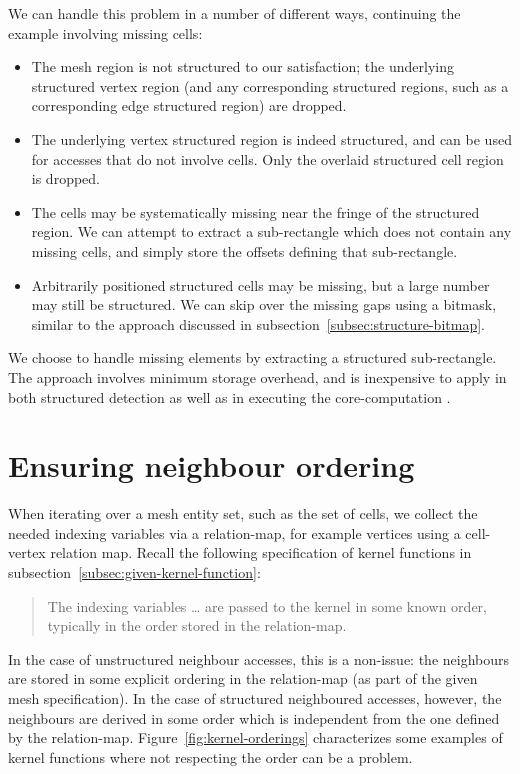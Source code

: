We can handle this problem in a number of different ways, continuing the example involving missing cells:
\begin{itemize}
\item The mesh region is not structured to our satisfaction; the underlying structured vertex region (and any corresponding structured regions, such as a corresponding edge structured region) are dropped.
\item The underlying vertex structured region is indeed structured, and can be used for accesses that do not involve cells. Only the overlaid structured cell region is dropped.
\item The cells may be systematically missing near the fringe of the structured region. We can attempt to extract a sub-rectangle which does not contain any missing cells, and simply store the offsets defining that sub-rectangle.
\item Arbitrarily positioned structured cells may be missing, but a large number may still be structured. We can skip over the missing gaps using a bitmask, similar to the approach discussed in subsection~\ref{subsec:structure-bitmap}.
\end{itemize}

We choose to handle missing elements by extracting a structured sub-rectangle. The approach involves minimum storage overhead, and is inexpensive to apply in both structured detection as well as in executing the core-computation .


\section{Ensuring neighbour ordering}
\label{sec:neighbour-ordering-intro}
When iterating over a mesh entity set, such as the set of cells, we collect the needed indexing variables via a relation-map, for example vertices using a cell-vertex relation map. Recall the following specification of kernel functions in subsection~\ref{subsec:given-kernel-function}:
\begin{quote}
The indexing variables \ldots{} are passed to the kernel in some known order, typically in the order stored in the relation-map.
\end{quote}

In the case of unstructured neighbour accesses, this is a non-issue: the neighbours are stored in some explicit ordering in the relation-map (as part of the given mesh specification). In the case of structured neighboured accesses, however, the neighbours are derived in some order which is independent from the one defined by the relation-map. Figure~\ref{fig:kernel-orderings} characterizes some examples of kernel functions where not respecting the order can be a problem.


